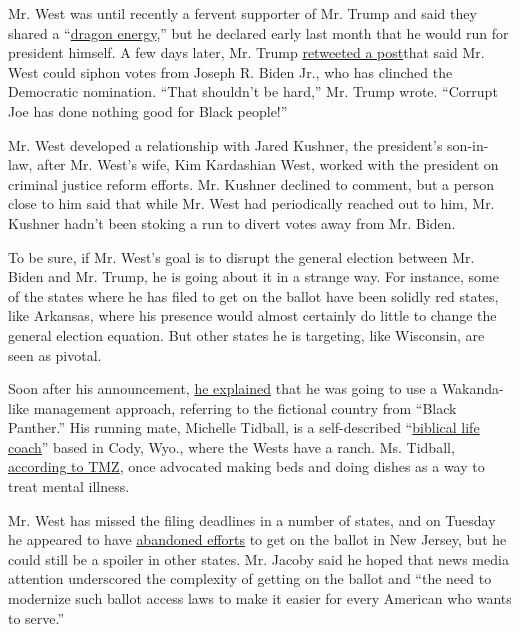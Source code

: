 Mr. West was until recently a fervent supporter of Mr. Trump and said
they shared a
``\href{https://www.theguardian.com/music/2018/apr/25/kanye-west-donald-trump-dragon-energy}{dragon
energy},'' but he declared early last month that he would run for
president himself. A few days later, Mr. Trump
\href{https://thehill.com/homenews/administration/506875-trump-shouldnt-be-hard-for-kanye-west-to-take-away-votes-from-biden}{retweeted
a post}that said Mr. West could siphon votes from Joseph R. Biden Jr.,
who has clinched the Democratic nomination. ``That shouldn't be hard,''
Mr. Trump wrote. ``Corrupt Joe has done nothing good for Black people!''

Mr. West developed a relationship with Jared Kushner, the president's
son-in-law, after Mr. West's wife, Kim Kardashian West, worked with the
president on criminal justice reform efforts. Mr. Kushner declined to
comment, but a person close to him said that while Mr. West had
periodically reached out to him, Mr. Kushner hadn't been stoking a run
to divert votes away from Mr. Biden.

To be sure, if Mr. West's goal is to disrupt the general election
between Mr. Biden and Mr. Trump, he is going about it in a strange way.
For instance, some of the states where he has filed to get on the ballot
have been solidly red states, like Arkansas, where his presence would
almost certainly do little to change the general election equation. But
other states he is targeting, like Wisconsin, are seen as pivotal.

Soon after his announcement,
\href{https://www.forbes.com/sites/randalllane/2020/07/08/kanye-west-says-hes-done-with-trump-opens-up-about-white-house-bid-damaging-biden-and-everything-in-between/\#7c02799647aa}{he
explained} that he was going to use a Wakanda-like management approach,
referring to the fictional country from ``Black Panther.'' His running
mate, Michelle Tidball, is a self-described
``\href{https://www.vanityfair.com/style/2020/07/kanye-west-vice-president-michelle-tidball}{biblical
life coach}'' based in Cody, Wyo., where the Wests have a ranch. Ms.
Tidball,
\href{https://www.tmz.com/2020/07/11/kanye-west-vp-michelle-tidball-mental-health-background-audio-bio/}{according
to TMZ}, once advocated making beds and doing dishes as a way to treat
mental illness.

Mr. West has missed the filing deadlines in a number of states, and on
Tuesday he appeared to have
\href{https://www.courthousenews.com/kanye-west-withdraws-petition-to-get-on-njs-2020-ballot/}{abandoned
efforts} to get on the ballot in New Jersey, but he could still be a
spoiler in other states. Mr. Jacoby said he hoped that news media
attention underscored the complexity of getting on the ballot and ``the
need to modernize such ballot access laws to make it easier for every
American who wants to serve.''

